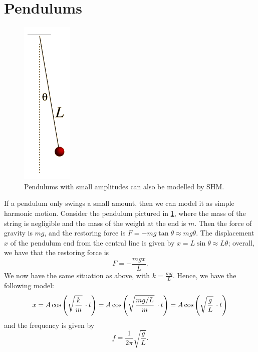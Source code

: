 \documentclass[a4paper]{amsbook}
\newcommand{\marginsymbol}{}
\theoremstyle{definition}
\numberwithin{exercise}{chapter}
\numberwithin{exercise}{chapter}
\begin{document}
\section{Pendulums}
\begin{figure}
  \centering
  \includegraphics[height=0.25\textheight]{pendulum}
  \caption{Pendulums with small amplitudes can also be modelled by SHM.\label{fig:pendulum}}
\end{figure}
\marginsymbol If a pendulum only swings a small amount, then we can model it as simple harmonic motion. Consider the pendulum pictured
in \cref{fig:pendulum}, where the mass of the string is negligible and the mass of the weight at the end is $ m $. Then
the force of gravity is $ mg $, and the restoring force is $ F = -mg \tan \theta \approx mg \theta $. The displacement $ x $ of the
pendulum end from the central line is given by $ x = L \sin \theta \approx L \theta $; overall, we have that the restoring force is
\begin{displaymath}
  F = -\frac{mgx}{L}.
\end{displaymath}
We now have the same situation as above, with $ k = \frac{mg}{L} $. Hence, we have the following model:
\begin{displaymath}
  x = A \cos\left(\sqrt{\frac{k}{m}} \thinspace\cdot t\right) = A \cos\left(\sqrt{\frac{mg/L}{m}} \thinspace\cdot t\right)
    = A \cos\left(\sqrt{\frac{g}{L}} \thinspace\cdot t\right)
\end{displaymath}
and the frequency is given by
\begin{equation}
  f = \frac{1}{2\pi} \sqrt{\frac{g}{L}}.
\end{equation}
\end{document}
